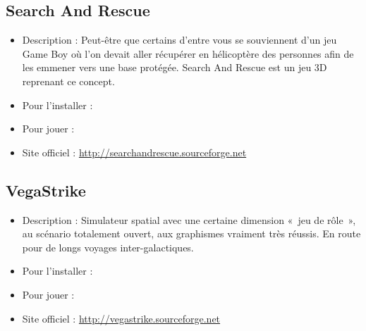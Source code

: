\subsection{Search And Rescue}
\begin{itemize}
\begingroup
{}
\item Description : Peut-être que certains d'entre vous se souviennent d'un jeu Game Boy où l'on devait aller récupérer en hélicoptère des personnes afin de les emmener vers une base protégée. Search And Rescue est un jeu 3D reprenant ce concept.{\par}
\item Pour l'installer : 
\item Pour jouer : 
\item Site officiel : \url{http://searchandrescue.sourceforge.net}{\par}
\endgroup
\end{itemize}
\subsection{VegaStrike}
\begin{itemize}
\begingroup
{}
\item Description : Simulateur spatial avec une certaine dimension «~jeu de rôle~», au scénario totalement ouvert, aux graphismes vraiment très réussis. En route pour de longs voyages inter-galactiques.{\par}
\endgroup
\item Pour l'installer : 
\item Pour jouer : 
\item Site officiel : \url{http://vegastrike.sourceforge.net}{\par}
\end{itemize}

